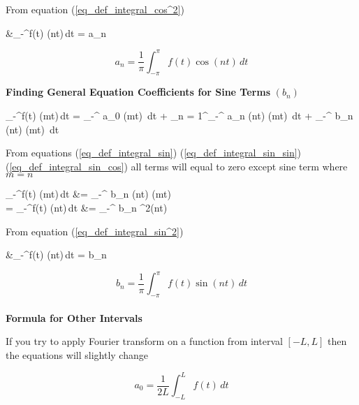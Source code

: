 \documentclass[12pt, a4paper]{article}
\numberwithin{equation}{section}
\begin{document}
		From equation (\ref{eq_def_integral_cos^2})
		\begin{flalign}\nonumber
			&\int_{-\pi}^{\pi}f(t) \cos(nt)\,dt = a_n\hspace{0.1cm} \pi
		\end{flalign}
	
		\begin{equation}
			a_n = \frac{1}{\pi} \int_{-\pi}^{\pi} f(t) \cos(nt)\,dt
			\label{eq_fourier_cos_coeff}
		\end{equation}\pagebreak
		
		\textbf{Finding General Equation Coefficients for Sine Terms} $(b_n)$
		\begin{adjustwidth}{-50pt}{0pt}
			\begin{flalign}\nonumber
				\int_{-\pi}^{\pi}f(t) \sin(mt)\,dt = \int_{-\pi}^{\pi} a_0 \sin(mt) \,dt + \sum_{n = 1}^\infty \int_{-\pi}^{\pi} a_n \cos(nt) \sin(mt) \,dt + \int_{-\pi}^{\pi} b_n \sin(nt) \sin(mt) \,dt
			\end{flalign}
		\end{adjustwidth}
		From equations (\ref{eq_def_integral_sin}) (\ref{eq_def_integral_sin_sin}) (\ref{eq_def_integral_sin_cos}) all terms will equal to zero except sine term where $m = n$
		\begin{flalign*}
			\int_{-\pi}^{\pi}f(t) \sin(mt)\,dt &= \int_{-\pi}^{\pi} b_n \sin(nt) \sin(mt)\\
			= \int_{-\pi}^{\pi}f(t) \sin(nt)\,dt &= \int_{-\pi}^{\pi} b_n \sin^2(nt)
		\end{flalign*}
		
		From equation (\ref{eq_def_integral_sin^2})
		\begin{flalign}\nonumber
			&\int_{-\pi}^{\pi}f(t) \sin(nt)\,dt = b_n\hspace{0.1cm} \pi
		\end{flalign}
	
		\begin{equation}
				b_n = \frac{1}{\pi} \int_{-\pi}^{\pi} f(t) \sin(nt)\,dt
				\label{eq_fourier_sin_coeff}
		\end{equation}\\

		\textbf{Formula for Other Intervals}
		
		If you try to apply Fourier transform on a function from interval $\left[-L, L\right]$ then the equations will slightly change
		
		\begin{equation}
			a_0 = \frac{1}{2L} \int_{-L}^{L}f(t) \,dt
			\label{eq_fourier_first_term_other_interval}
		\end{equation}
		
\end{document}
